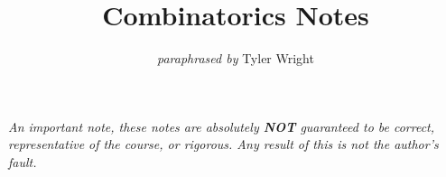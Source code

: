\documentclass[a4paper, 12pt, twoside]{article}
\begin{document}
\title{Combinatorics Notes}
\date{}
\author{\textit{paraphrased by} Tyler Wright}
\maketitle

\vfill

\textit{An important note, these notes are absolutely \textbf{NOT}
  guaranteed to be correct, representative of the course, or rigorous.
  Any result of this is not the author's fault.}

\addtocounter{section}{-1}



\newpage

\tableofcontents





\end{document}
